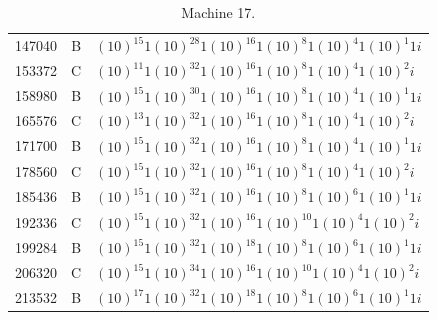 \documentclass[12pt]{article}
\begin{document}
\begin{table}[H]
\begin{Parallel}[c]{0.48\textwidth}{0.48\textwidth}
{{\begin{scriptsize}
\begin{tabular}{rrl}
147040&B&$(10)^{15}1(10)^{28}1(10)^{16}1(10)^{8}1(10)^{4}1(10)^{1}1i$\\
153372&C&$(10)^{11}1(10)^{32}1(10)^{16}1(10)^{8}1(10)^{4}1(10)^{2}i$\\
158980&B&$(10)^{15}1(10)^{30}1(10)^{16}1(10)^{8}1(10)^{4}1(10)^{1}1i$\\
165576&C&$(10)^{13}1(10)^{32}1(10)^{16}1(10)^{8}1(10)^{4}1(10)^{2}i$\\
171700&B&$(10)^{15}1(10)^{32}1(10)^{16}1(10)^{8}1(10)^{4}1(10)^{1}1i$\\
178560&C&$(10)^{15}1(10)^{32}1(10)^{16}1(10)^{8}1(10)^{4}1(10)^{2}i$\\
185436&B&$(10)^{15}1(10)^{32}1(10)^{16}1(10)^{8}1(10)^{6}1(10)^{1}1i$\\
192336&C&$(10)^{15}1(10)^{32}1(10)^{16}1(10)^{10}1(10)^{4}1(10)^{2}i$\\
199284&B&$(10)^{15}1(10)^{32}1(10)^{18}1(10)^{8}1(10)^{6}1(10)^{1}1i$\\
206320&C&$(10)^{15}1(10)^{34}1(10)^{16}1(10)^{10}1(10)^{4}1(10)^{2}i$\\
213532&B&$(10)^{17}1(10)^{32}1(10)^{18}1(10)^{8}1(10)^{6}1(10)^{1}1i$\\
\end{tabular}
\end{scriptsize}}}
\end{Parallel}
\caption{\label{tab:17}Machine 17.}
\end{table}
\end{document}
